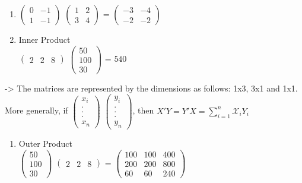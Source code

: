 \documentclass[]{article}
\begin{document}
\begin{enumerate}
\def\labelenumi{\alph{enumi})}
\setcounter{enumi}{2}
\item
  \(\begin{pmatrix} 0 & -1 \\ 1 & -1 \end{pmatrix}\)
  \(\begin{pmatrix} 1 & 2 \\ 3 & 4 \end{pmatrix}\) =
  \(\begin{pmatrix} -3 & -4 \\ -2 & -2 \end{pmatrix}\)\\
\item
  Inner Product\\
   \(\begin{pmatrix} 2 & 2 & 8 \end{pmatrix}\)
  \(\begin{pmatrix} 50 \\ 100 \\ 30 \end{pmatrix}\) = \(540\)\\
\end{enumerate}

-\textgreater{} The matrices are represented by the dimensions as
follows: 1x3, 3x1 and 1x1.\\

More generally, if
\(\begin{pmatrix} x_i \\ .\\ .\\.\\x_n \end{pmatrix}\)
\(\begin{pmatrix} y_i \\ .\\ .\\.\\y_n \end{pmatrix}\), then
\(X'Y=Y'X = \sum\limits_{i=1}^n \mathcal X_{i}Y_{i}\)

\begin{enumerate}
\def\labelenumi{\alph{enumi})}
\setcounter{enumi}{4}
\item
  Outer Product\\

  \(\begin{pmatrix} 50 \\ 100 \\ 30 \end{pmatrix}\)
  \(\begin{pmatrix} 2 & 2 & 8 \end{pmatrix}\) =
  \(\begin{pmatrix} 100 & 100 & 400 \\ 200 & 200 & 800 \\ 60 & 60 & 240 \end{pmatrix}\)\\
\end{enumerate}
\end{document}
